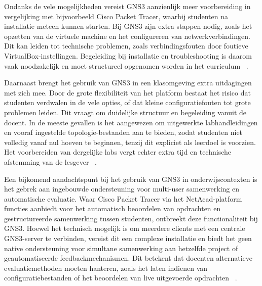 \vspace{0.3cm}

Ondanks de vele mogelijkheden vereist GNS3 aanzienlijk meer voorbereiding in vergelijking met bijvoorbeeld Cisco Packet Tracer, waarbij studenten na installatie meteen kunnen starten. Bij GNS3 zijn extra stappen nodig, zoals het opzetten van de virtuele machine en het configureren van netwerkverbindingen. Dit kan leiden tot technische problemen, zoals verbindingsfouten door foutieve VirtualBox-instellingen. Begeleiding bij installatie en troubleshooting is daarom vaak noodzakelijk en moet structureel opgenomen worden in het curriculum ~\autocite{gns3_docs2025}.

\vspace{0.3cm}

Daarnaast brengt het gebruik van GNS3 in een klasomgeving extra uitdagingen met zich mee. Door de grote flexibiliteit van het platform bestaat het risico dat studenten verdwalen in de vele opties, of dat kleine configuratiefouten tot grote problemen leiden. Dit vraagt om duidelijke structuur en begeleiding vanuit de docent. In de meeste gevallen is het aangewezen om uitgewerkte labhandleidingen en vooraf ingestelde topologie-bestanden aan te bieden, zodat studenten niet volledig vanaf nul hoeven te beginnen, tenzij dit expliciet als leerdoel is voorzien. Het voorbereiden van dergelijke labs vergt echter extra tijd en technische afstemming van de lesgever ~\autocite{gns3_docs2025}.

\vspace{0.3cm}

Een bijkomend aandachtspunt bij het gebruik van GNS3 in onderwijscontexten is het gebrek aan ingebouwde ondersteuning voor multi-user samenwerking en automatische evaluatie. Waar Cisco Packet Tracer via het NetAcad-platform functies aanbiedt voor het automatisch beoordelen van opdrachten en gestructureerde samenwerking tussen studenten, ontbreekt deze functionaliteit bij GNS3. Hoewel het technisch mogelijk is om meerdere clients met een centrale GNS3-server te verbinden, vereist dit een complexe installatie en biedt het geen native ondersteuning voor simultane samenwerking aan hetzelfde project of geautomatiseerde feedbackmechanismen. Dit betekent dat docenten alternatieve evaluatiemethoden moeten hanteren, zoals het laten indienen van configuratiebestanden of het beoordelen van live uitgevoerde opdrachten ~\autocite{gns3_multiuser}.

\vspace{0.3cm}

